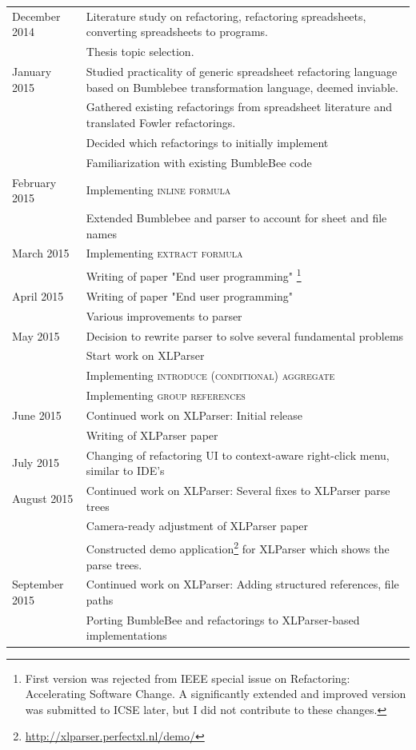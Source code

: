 \documentclass[12pt,a4paper,onecolumn,oneside,parskip]{memoir}
\newcommand{\rf}[1]{\textsc{\lowercase{#1}}}
\begin{document}
\begin{tabularx}{\textwidth}{lX}
\toprule
December 2014 & Literature study on refactoring, refactoring spreadsheets, converting spreadsheets to programs. \\
& Thesis topic selection. \\
January 2015 & Studied practicality of generic spreadsheet refactoring language based on Bumblebee transformation language, deemed inviable. \\
& Gathered existing refactorings from spreadsheet literature and translated Fowler refactorings. \\
& Decided which refactorings to initially implement \\
& Familiarization with existing BumbleBee code \\
February 2015 & Implementing \rf{Inline Formula} \\
& Extended Bumblebee and parser to account for sheet and file names \\
March 2015 & Implementing \rf{Extract formula} \\
& Writing of paper "End user programming" \footnote{First version was rejected from IEEE special issue on Refactoring: Accelerating Software Change. A significantly extended and improved version was submitted to ICSE later, but I did not contribute to these changes.} \\
April 2015 & Writing of paper "End user programming" \\
& Various improvements to parser \\
May 2015 & Decision to rewrite parser to solve several fundamental problems \\
& Start work on XLParser \\
& Implementing \rf{Introduce (Conditional) Aggregate} \\
& Implementing \rf{Group references} \\
June 2015 & Continued work on XLParser: Initial release \\
& Writing of XLParser paper \\
July 2015 & Changing of refactoring UI to context-aware right-click menu, similar to IDE's \\
August 2015 & Continued work on XLParser: Several fixes to XLParser parse trees \\
& Camera-ready adjustment of XLParser paper \\
& Constructed demo application\footnote{\url{http://xlparser.perfectxl.nl/demo/}} for XLParser which shows the parse trees. \\
September 2015 & Continued work on XLParser: Adding structured references, file paths \\
& Porting BumbleBee and refactorings to XLParser-based implementations \\
\bottomrule
\end{tabularx}
\end{document}

